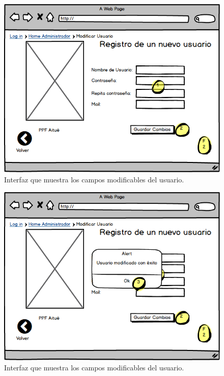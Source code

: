 \begin{figure}[h!]
	\label{moduser4}
	\begin{center}
		\includegraphics[scale=0.3]{imagenes/moduser4.png}
	\end{center}
	\caption{Interfaz que muestra los campos modificables del usuario.}
\end{figure}

\begin{figure}[h!]
	\label{moduser5}
	\begin{center}
		\includegraphics[scale=0.3]{imagenes/moduser5.png}
	\end{center}
	\caption{Interfaz que muestra los campos modificables del usuario.}
\end{figure}

